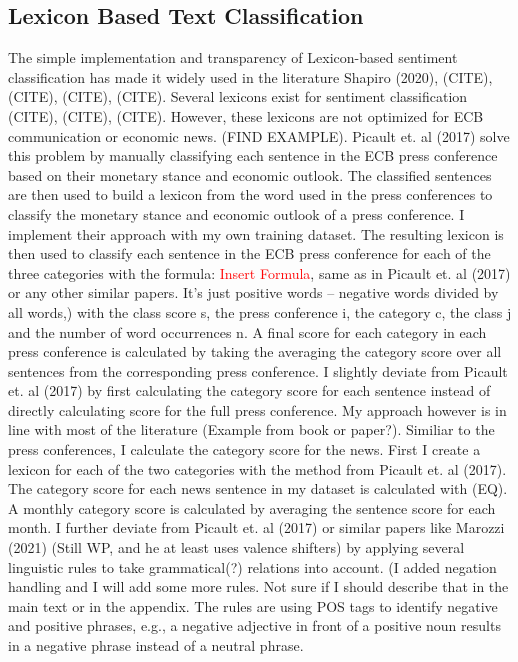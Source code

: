 \documentclass[review]{elsarticle}
\begin{document}
\subsection{Lexicon Based Text Classification}
The simple implementation and transparency of Lexicon-based sentiment classification has made it widely used in the literature Shapiro (2020), (CITE), (CITE), (CITE), (CITE). Several lexicons exist for sentiment classification (CITE), (CITE), (CITE). However, these lexicons are not optimized for ECB communication or economic news. (FIND EXAMPLE). Picault et. al (2017) solve this problem by manually classifying each sentence in the ECB press conference based on their monetary stance and economic outlook. The classified sentences are then used to build a lexicon from the word used in the press conferences to classify the monetary stance and economic outlook of a press conference. I implement their approach with my own training dataset. The resulting lexicon is then used to classify each sentence in the ECB press conference for each of the three categories with the formula:
\textcolor{red}{Insert Formula}, same as in Picault et. al (2017) or any other similar papers. It’s just positive words – negative words divided by all words,)
with the class score s, the press conference i, the category c, the class j and the number of word occurrences n. A final score for each category in each press conference is calculated by taking the averaging the category score over all sentences from the corresponding press conference.
I slightly deviate from Picault et. al (2017) by first calculating the category score for each sentence instead of directly calculating score for the full press conference. My approach however is in line with most of the literature (Example from book or paper?).
Similiar to the press conferences, I calculate the category score for the news. First I create a lexicon for each of the two categories with the method from Picault et. al (2017). The category score for each news sentence in my dataset is calculated with (EQ). A monthly category score is calculated by averaging the sentence score for each month.
I further deviate from Picault et. al (2017) or similar papers like Marozzi (2021) (Still WP, and he at least uses valence shifters) by applying several linguistic rules to take grammatical(?) relations into account.
(I added negation handling and I will add some more rules. Not sure if I should describe that in the main text or in the appendix. The rules are using POS tags to identify negative and positive phrases, e.g., a negative adjective in front of a positive noun results in a negative phrase instead of a neutral phrase.
\end{document}
